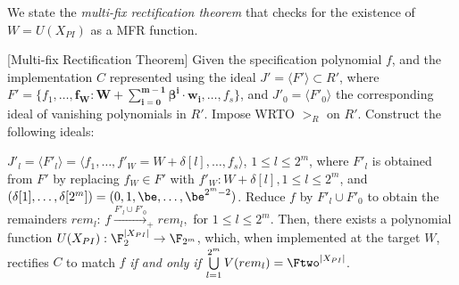 We state the {\it multi-fix rectification theorem} that checks
for the existence of $W = U(X_{PI})$ as a MFR function.

\begin{Theorem}{[Multi-fix Rectification Theorem]}\label{Thm:rect}
Given the specification polynomial $f$, and the implementation
$C$ represented using the ideal $J' = \langle F'\rangle\subset R'$,
where $F'=\{f_1,\dots,\bm{f_W:W+\sum_{i=0}^{m-1}\beta^i \cdot w_i},
\dots,f_s\}$, and $J'_0=\langle F'_0\rangle$ the corresponding ideal
of vanishing polynomials in $R'$. Impose WRTO $>_R$ on $R'$.
Construct the following ideals:  
\bi
\item {\small $J'_l = \langle F'_l\rangle =\langle f_1,\dots,f'_W=W+\delta[l],\dots,f_s\rangle$},
  $1 \leq l \leq 2^m$, where $F'_l$ is obtained from $F'$ by
  replacing $f_W \in F'$ with $f'_W: W + \delta[l], 1\leq l \leq 2^m$,
  and $(\delta[1],\dots,\delta[2^{m}]) =
  (0,1,\be,\dots,\be^{2^m-2})$. 
\ei
Reduce $f$ by $F'_l\cup F'_0$ to obtain the remainders $rem_l$: 
$f\xrightarrow{F'_l\cup F'_{0}}_+ rem_l,$  for $1 \leq l \leq 2^m$. 
Then, there exists a polynomial function 
$U(X_{PI}): \F_{2}^{|X_{PI}|}\rightarrow \F_{2^m}$, which, when
 implemented at the target $W$, rectifies $C$ to match $f$ \textit{if
   and only if} $\bigcup\limits_{l=1}^{2^m}V(rem_l) = \Ftwo^{|X_{PI}|}$.
\end{Theorem}

